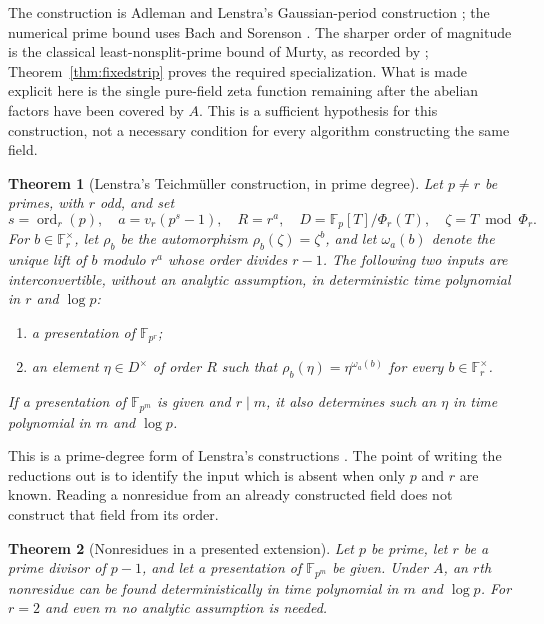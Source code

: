 \documentclass[11pt]{article}
\newcommand{\F}{\mathbb F}
\newcommand{\ord}{\operatorname{ord}}
\newtheorem{theorem}{Theorem}[section]
\theoremstyle{definition}
\theoremstyle{remark}
\begin{document}
The construction is Adleman and Lenstra's Gaussian-period construction
\citep[Algorithm A, pp.~350--351]{AdlemanLenstra1986}; the numerical
prime bound uses Bach and Sorenson \citep[Theorem~5.1, p.~1729]{BachSorenson1996}.
The sharper order of magnitude is the classical least-nonsplit-prime
bound of Murty, as recorded by \citet[p.~1, equation~(1.2)]{Zaman2018};
Theorem~\ref{thm:fixedstrip} proves the required specialization.
What is made explicit here is the single pure-field zeta function remaining
after the abelian factors have been covered by $A$.
This is a sufficient hypothesis for this construction, not a necessary
condition for every algorithm constructing the same field.

\begin{theorem}[Lenstra's Teichm\"uller construction, in prime degree]
\label{thm:teich}
Let $p\ne r$ be primes, with $r$ odd, and set
\[
 s=\ord_r(p),\quad a=v_r(p^s-1),\quad R=r^a,
 \quad D=\F_p[T]/\Phi_r(T),\quad \zeta=T\bmod\Phi_r.
\]
For $b\in\F_r^\times$, let $\rho_b$ be the automorphism
$\rho_b(\zeta)=\zeta^b$, and let $\omega_a(b)$ denote the unique
lift of $b$ modulo $r^a$ whose order divides $r-1$.
The following two inputs are interconvertible, without an analytic
assumption, in deterministic time polynomial in $r$ and $\log p$:
\begin{enumerate}
\item a presentation of $\F_{p^r}$;
\item an element $\eta\in D^\times$ of order $R$ such that
$\rho_b(\eta)=\eta^{\omega_a(b)}$ for every $b\in\F_r^\times$.
\end{enumerate}
If a presentation of $\F_{p^m}$ is given and $r\mid m$, it also
determines such an $\eta$ in time polynomial in $m$ and $\log p$.
\end{theorem}

This is a prime-degree form of Lenstra's constructions
\citep[Theorems~(3.1), (5.1), and (5.2), pp.~334--340]{Lenstra1991}.
The point of writing the reductions out is to identify the input which
is absent when only $p$ and $r$ are known.  Reading a nonresidue from an
already constructed field does not construct that field from its order.

\begin{theorem}[Nonresidues in a presented extension]
\label{thm:nonresidue}
Let $p$ be prime, let $r$ be a prime divisor of $p-1$, and let a
presentation of $\F_{p^m}$ be given.  Under $A$, an $r$th nonresidue
can be found deterministically in time polynomial in $m$ and $\log p$.
For $r=2$ and even $m$ no analytic assumption is needed.
\end{theorem}
\end{document}
